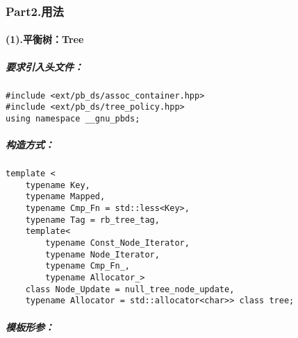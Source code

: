 \documentclass[]{article}
\let\oldparagraph\paragraph
\renewcommand{\paragraph}[1]{\oldparagraph{#1}\mbox{}}
\let\oldsubparagraph\subparagraph
\renewcommand{\subparagraph}[1]{\oldsubparagraph{#1}\mbox{}}
\begin{document}
\hypertarget{part2.ux7528ux6cd5}{%
\subsubsection{Part2.用法}\label{part2.ux7528ux6cd5}}

\hypertarget{ux5e73ux8861ux6811tree}{%
\paragraph{(1).平衡树：Tree}\label{ux5e73ux8861ux6811tree}}

\hypertarget{ux8981ux6c42ux5f15ux5165ux5934ux6587ux4ef6}{%
\subparagraph{要求引入头文件：}\label{ux8981ux6c42ux5f15ux5165ux5934ux6587ux4ef6}}

\begin{verbatim}
#include <ext/pb_ds/assoc_container.hpp>
#include <ext/pb_ds/tree_policy.hpp>
using namespace __gnu_pbds;
\end{verbatim}

\hypertarget{ux6784ux9020ux65b9ux5f0f}{%
\subparagraph{构造方式：}\label{ux6784ux9020ux65b9ux5f0f}}

\begin{verbatim}
template <
    typename Key,
    typename Mapped,
    typename Cmp_Fn = std::less<Key>,
    typename Tag = rb_tree_tag,
    template<
        typename Const_Node_Iterator,
        typename Node_Iterator,
        typename Cmp_Fn_,
        typename Allocator_>
    class Node_Update = null_tree_node_update,
    typename Allocator = std::allocator<char>> class tree;
\end{verbatim}

\hypertarget{ux6a21ux677fux5f62ux53c2}{%
\subparagraph{模板形参：}\label{ux6a21ux677fux5f62ux53c2}}
\end{document}
